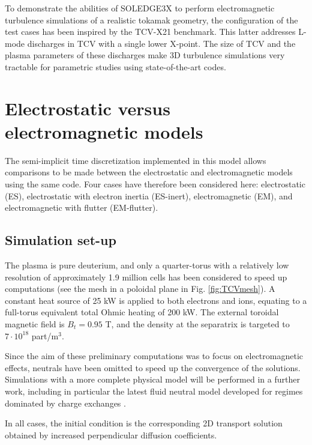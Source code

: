 To demonstrate the abilities of SOLEDGE3X to perform electromagnetic turbulence simulations of a realistic tokamak geometry, the configuration of the test cases has been inspired by the TCV-X21 benchmark\cite{oliveira2022}. This latter addresses L-mode discharges in TCV with a single lower X-point. The size of TCV and the plasma parameters of these discharges make 3D turbulence simulations very tractable for parametric studies using state-of-the-art codes.


\section{Electrostatic versus electromagnetic models}

The semi-implicit time discretization implemented in this model allows comparisons to be made between the electrostatic and electromagnetic models using the same code. Four cases have therefore been considered here: electrostatic (ES), electrostatic with electron inertia (ES-inert), electromagnetic (EM), and electromagnetic with flutter (EM-flutter).

\subsection{Simulation set-up}

The plasma is pure deuterium, and only a quarter-torus with a relatively low resolution of approximately 1.9 million cells has been considered to speed up computations (see the mesh in a poloidal plane in Fig. \ref{fig:TCVmesh}). A constant heat source of 25 kW is applied to both electrons and ions, equating to a full-torus equivalent total Ohmic heating of 200 kW. The external toroidal magnetic field is $B_t = 0.95$ T, and the density at the separatrix is targeted to $7 \cdot 10^{18}$ part/m$^3$. \newline

Since the aim of these preliminary computations was to focus on electromagnetic effects, neutrals have been omitted to speed up the convergence of the solutions. Simulations with a more complete physical model will be performed in a further work, including in particular the latest fluid neutral model \cite{quadri2024} developed for regimes dominated by charge exchanges \cite{horsten2017}. \newline

In all cases, the initial condition is the corresponding 2D transport solution obtained by increased perpendicular diffusion coefficients. \newline

